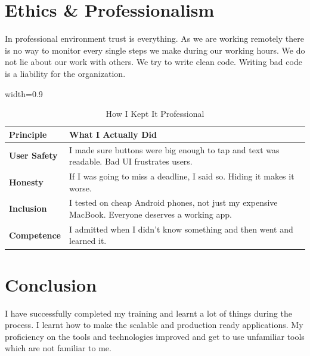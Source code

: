 
\section{Ethics \& Professionalism}

\par In professional environment trust is everything. As we are working remotely there is no way to monitor every single steps we make during our working hours. We do not lie about our work with others. We try to write clean code. Writing bad code is a liability for the organization.

\begin{table}[H]
\centering
\caption{How I Kept It Professional}
\begin{adjustbox}{width=0.9\textwidth}
\begin{tabular}{|l|p{10cm}|}
\hline
\textbf{Principle} & \textbf{What I Actually Did} \\ \hline
\textbf{User Safety} & I made sure buttons were big enough to tap and text was readable. Bad UI frustrates users. \\ \hline
\textbf{Honesty} & If I was going to miss a deadline, I said so. Hiding it makes it worse. \\ \hline
\textbf{Inclusion} & I tested on cheap Android phones, not just my expensive MacBook. Everyone deserves a working app. \\ \hline
\textbf{Competence} & I admitted when I didn't know something and then went and learned it. \\ \hline
\end{tabular}
\end{adjustbox}
\label{tab:ieee-ethics-mapping}
\end{table}

\section{Conclusion}

\par I have successfully completed my training and learnt a lot of things during the process. I learnt how to make the scalable and production ready applications. My proficiency on the tools and technologies improved and get to use unfamiliar tools which are not familiar to me.